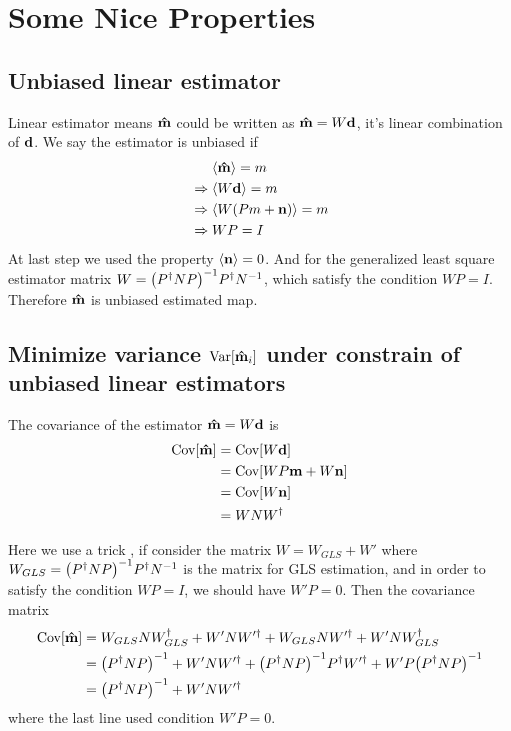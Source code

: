 \documentclass[11pt, letterpaper]{article}
\newcommand{\Var}[1]{\text{Var}\qty[#1]}
\newcommand{\Cov}[1]{\text{Cov}\qty[#1]}
\newcommand{\vbd}{\vb{d}}
\newcommand{\vbm}{\vb{m}}
\newcommand{\vbn}{\vb{n}}
\newcommand{\inv}[1]{#1^{-1}}
\newcommand{\hatm}{\vb{\hat{m}}}
\newcommand{\Pdagger}{P^{\dagger}}
\newcommand{\PPinv}[1]{\inv{\qty(\Pdagger #1 P)}}
\begin{document}
\section{Some Nice Properties}

\subsection{Unbiased linear estimator}
Linear estimator means $\hatm$ could be written as $\hatm = W\vbd$,
it's linear combination of $\vbd$.
We say the estimator is unbiased if
\begin{align}
\begin{aligned}[b]
&\mathrel{\phantom{\Rightarrow}}\ev{\hatm} = m \\
&\Rightarrow\ev{W \vbd} = m\\
&\Rightarrow\ev{W(Pm + \vbn) } = m \\
&\Rightarrow WP = I
\end{aligned}
\end{align}
At last step we used the property  $\ev{\vbn} = 0$.
And for the generalized least square estimator matrix 
$W = \PPinv{N} \Pdagger \inv{N}  $, which satisfy the condition $WP=I$.
Therefore $\hatm$ is unbiased estimated map.


\subsection{Minimize variance $\Var{\hatm_i}$ under constrain of unbiased 
linear estimators} \label{minimize variance}
The covariance of the estimator $\hatm = W \vbd$ is
\begin{align}
\begin{aligned}[b]
\Cov{\hatm} &= \Cov{W\vbd} 
\\ 
&= \Cov{WP\vbm + W\vbn} 
\\ 
&= \Cov{W\vbn} 
\\ 
&= W N W^{\dagger} \label{covariance hatm}
\end{aligned}
\end{align}

Here we use a trick \cite{weighted_and_GLS},
if consider the matrix $W = W_{GLS} + W'$ where
$W_{GLS} = \PPinv{N} \Pdagger \inv{N} $ is the matrix for GLS estimation,
and in order to satisfy the condition $WP = I$, we should have $W'P = 0$.
Then the covariance matrix
\begin{align}
\begin{aligned}[b]
\Cov{\hatm }
&= W_{GLS} N W_{GLS}^{\dagger} + W' N W'^{\dagger} 
    + W_{GLS} N W'^{\dagger} + W' N W_{GLS}^{\dagger}
\\
&= \PPinv{N} + W' N W'^{\dagger} 
    + \PPinv{N} \Pdagger W'^{\dagger} + W' P \PPinv{N}
\\
&= \PPinv{N} + W' N W'^{\dagger} 
\end{aligned}
\end{align}
where the last line used condition $W'  P = 0$.
\end{document}

